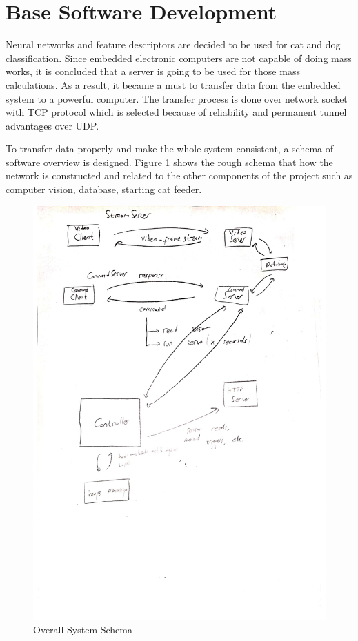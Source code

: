 \section{Base Software Development} \label{sec:software}

Neural networks and feature descriptors are decided to be used for cat and dog classification. Since embedded electronic computers are not capable of doing mass works, it is concluded that a server is going to be used for those mass calculations. As a result, it became a must to transfer data from the embedded system to a powerful computer. The transfer process is done over network socket with TCP protocol which is selected because of reliability and permanent tunnel advantages over UDP\cite{cite:TCPProtocol}.

To transfer data properly and make the whole system consistent, a schema of software overview is designed. Figure \ref{fig:overallView} shows the rough schema that how the network is constructed and related to the other components of the project such as computer vision, database, starting cat feeder.

\begin{figure}[htp]
    \centering
    \includegraphics[width=0.9\linewidth]{SchemaSharpened.jpg}
    \caption{Overall System Schema}
    \label{fig:overallView}
\end{figure}

